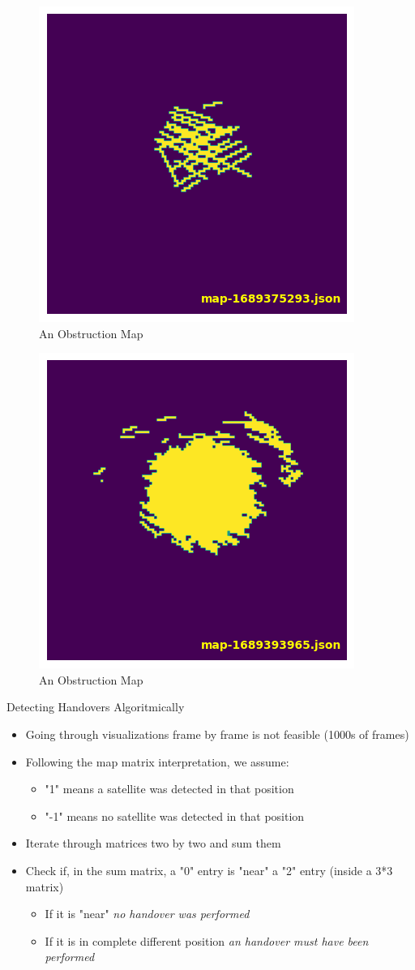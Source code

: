 \documentclass[NET,english,beameralt]{tumbeamer}
\begin{document}
\begin{frame}[fragile]
    \begin{figure}
        \includegraphics[width=0.4\columnwidth]{pics/map3.png}
        \caption{An Obstruction Map}
    \end{figure}
\end{frame}

\begin{frame}[fragile]
    \begin{figure}
        \includegraphics[width=0.4\columnwidth]{pics/map4.png}
        \caption{An Obstruction Map}
    \end{figure}
\end{frame}

\begin{frame}{Detecting Handovers Algoritmically}
    \begin{itemize}
        \item Going through visualizations frame by frame is not feasible (1000s of frames)
        \item Following the map matrix interpretation, we assume:
        \begin{itemize}
            \item "1" means a satellite was detected in that position
            \item  "-1" means no satellite was detected in that position
        \end{itemize} 
        \item Iterate through matrices two by two and sum them
        \item Check if, in the sum matrix, a "0" entry is "near" a "2" entry (inside a 3*3 matrix)
            \begin{itemize}
                \item If it is "near" \emph{no handover was performed}
                \item If it is in complete different position \emph{an handover must have been performed}
            \end{itemize}
    \end{itemize}
\end{frame}
\end{document}
